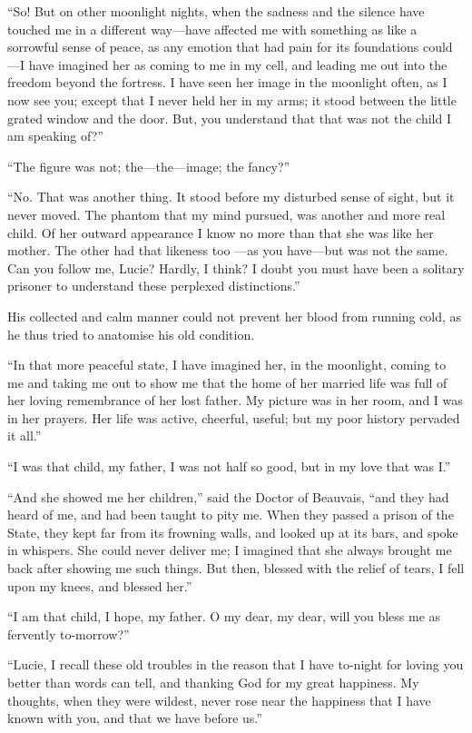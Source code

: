 ``So!  But on other moonlight nights, when the sadness and the silence
have touched me in a different way---have affected me with something as
like a sorrowful sense of peace, as any emotion that had pain for its
foundations could---I have imagined her as coming to me in my cell, and
leading me out into the freedom beyond the fortress.  I have seen her
image in the moonlight often, as I now see you; except that I never held
her in my arms; it stood between the little grated window and the door.
But, you understand that that was not the child I am speaking of?''

``The figure was not; the---the---image; the fancy?''

``No.  That was another thing.  It stood before my disturbed sense of
sight, but it never moved.  The phantom that my mind pursued, was
another and more real child.  Of her outward appearance I know no more
than that she was like her mother.  The other had that likeness too%
---as you have---but was not the same.  Can you follow me, Lucie?
Hardly, I think?  I doubt you must have been a solitary prisoner to
understand these perplexed distinctions.''

His collected and calm manner could not prevent her blood from running
cold, as he thus tried to anatomise his old condition.

``In that more peaceful state, I have imagined her, in the moonlight,
coming to me and taking me out to show me that the home of her married
life was full of her loving remembrance of her lost father.  My picture
was in her room, and I was in her prayers.  Her life was active,
cheerful, useful; but my poor history pervaded it all.''

``I was that child, my father, I was not half so good, but in my love
that was I.''

``And she showed me her children,'' said the Doctor of Beauvais, ``and
they had heard of me, and had been taught to pity me.  When they
passed a prison of the State, they kept far from its frowning walls,
and looked up at its bars, and spoke in whispers.  She could never
deliver me; I imagined that she always brought me back after showing
me such things.  But then, blessed with the relief of tears,
I fell upon my knees, and blessed her.''

``I am that child, I hope, my father.  O my dear, my dear, will you
bless me as fervently to-morrow?''

``Lucie, I recall these old troubles in the reason that I have to-night
for loving you better than words can tell, and thanking God for my
great happiness.  My thoughts, when they were wildest, never rose near
the happiness that I have known with you, and that we have before us.''

